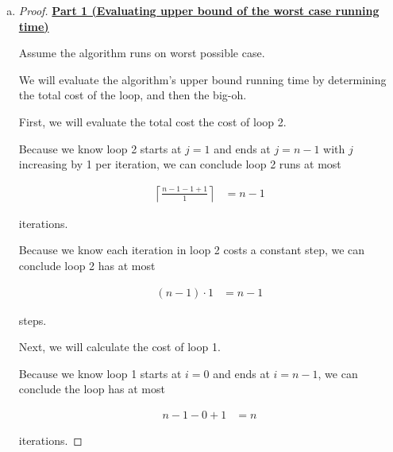 \documentclass[12pt]{article}
\begin{document}
\begin{enumerate}[a.]
    \item

    \begin{proof}

        \bigskip

        \underline{\textbf{Part 1 (Evaluating upper bound of the worst case running time)}}

        \bigskip

        Assume the algorithm runs on worst possible case.

        \bigskip

        We will evaluate the algorithm's upper bound running time by determining
        the total cost of the loop, and then the big-oh.

        \bigskip

        First, we will evaluate the total cost the cost of loop 2.

        \bigskip

        Because we know loop 2 starts at $j = 1$ and ends at $j = n-1$ with
        $j$ increasing by 1 per iteration, we can conclude loop 2 runs at most

        \setcounter{equation}{0}
        \begin{align}
            \left\lceil \frac{n-1-1+1}{1} \right\rceil &= n - 1
        \end{align}

        iterations.

        \bigskip

        Because we know each iteration in loop 2 costs a constant step, we can
        conclude loop 2 has at most

        \begin{align}
            (n - 1) \cdot 1 &= n - 1
        \end{align}

        steps.

        \bigskip

        Next, we will calculate the cost of loop 1.

        \bigskip

        Because we know loop 1 starts at $i = 0$ and ends at $i = n-1$,
        we can conclude the loop has at most

        \begin{align}
            n -1 - 0 + 1 &= n
        \end{align}

        iterations.


\end{proof}
\end{enumerate}
\end{document}
